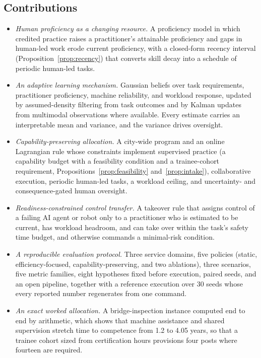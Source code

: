 \documentclass[utf8]{FrontiersinHarvard}
\begin{document}
	\subsection{Contributions}
	\label{sec:contributions}

	\begin{itemize}
		\item \textit{Human proficiency as a changing resource.} A proficiency model in which credited practice raises a practitioner's attainable proficiency and gaps in human-led work erode current proficiency, with a closed-form recency interval (Proposition~\ref{prop:recency}) that converts skill decay into a schedule of periodic human-led tasks.
		\item \textit{An adaptive learning mechanism.} Gaussian beliefs over task requirements, practitioner proficiency, machine reliability, and workload response, updated by assumed-density filtering from task outcomes and by Kalman updates from multimodal observations where available. Every estimate carries an interpretable mean and variance, and the variance drives oversight.
		\item \textit{Capability-preserving allocation.} A city-wide program and an online Lagrangian rule whose constraints implement supervised practice (a capability budget with a feasibility condition and a trainee-cohort requirement, Propositions~\ref{prop:feasibility} and~\ref{prop:intake}), collaborative execution, periodic human-led tasks, a workload ceiling, and uncertainty- and consequence-gated human oversight.
		\item \textit{Readiness-constrained control transfer.} A takeover rule that assigns control of a failing AI agent or robot only to a practitioner who is estimated to be current, has workload headroom, and can take over within the task's safety time budget, and otherwise commands a minimal-risk condition.
		\item \textit{A reproducible evaluation protocol.} Three service domains, five policies (static, efficiency-focused, capability-preserving, and two ablations), three scenarios, five metric families, eight hypotheses fixed before execution, paired seeds, and an open pipeline, together with a reference execution over 30 seeds whose every reported number regenerates from one command.
		\item \textit{An exact worked allocation.} A bridge-inspection instance computed end to end by arithmetic, which shows that machine assistance and shared supervision stretch time to competence from 1.2 to 4.05 years, so that a trainee cohort sized from certification hours provisions four posts where fourteen are required.
	\end{itemize}
\end{document}
